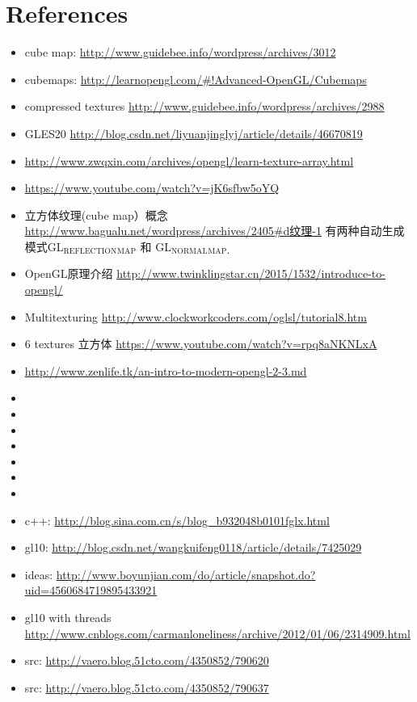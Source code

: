 \documentclass[9pt,b5paper]{article}
\begin{document}
\section{References}
\label{sec-2}
\begin{itemize}
\item cube map: \url{http://www.guidebee.info/wordpress/archives/3012}
\item cubemaps: \url{http://learnopengl.com/#!Advanced-OpenGL/Cubemaps}
\item compressed textures \url{http://www.guidebee.info/wordpress/archives/2988}
\item GLES20 \url{http://blog.csdn.net/liyuanjinglyj/article/details/46670819}
\item \url{http://www.zwqxin.com/archives/opengl/learn-texture-array.html}
\item \url{https://www.youtube.com/watch?v=jK6sfbw5oYQ}
\item 立方体纹理(cube map）概念 \url{http://www.bagualu.net/wordpress/archives/2405#d纹理-1} 
  有两种自动生成模式GL$_{\text{REFLECTION}}$$_{\text{MAP}}$ 和 GL$_{\text{NORMAL}}$$_{\text{MAP．}}$
\item OpenGL原理介绍 \url{http://www.twinklingstar.cn/2015/1532/introduce-to-opengl/}
\item Multitexturing \url{http://www.clockworkcoders.com/oglsl/tutorial8.htm}
\item 6 textures 立方体 \url{https://www.youtube.com/watch?v=rpq8aNKNLxA}
\item \url{http://www.zenlife.tk/an-intro-to-modern-opengl-2-3.md}
\item 
\item 
\item 
\item 
\item 
\item 
\item 
\item c++: \url{http://blog.sina.com.cn/s/blog_b932048b0101fglx.html}
\item gl10: \url{http://blog.csdn.net/wangkuifeng0118/article/details/7425029}
\item ideas: \url{http://www.boyunjian.com/do/article/snapshot.do?uid=4560684719895433921}
\item gl10 with threads \url{http://www.cnblogs.com/carmanloneliness/archive/2012/01/06/2314909.html}
\item src: \url{http://vaero.blog.51cto.com/4350852/790620}
\item src: \url{http://vaero.blog.51cto.com/4350852/790637}

\end{itemize}
\end{document}
